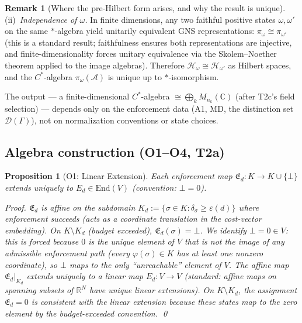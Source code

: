 \documentclass[11pt,a4paper]{article}
\newtheorem{proposition}[theorem]{Proposition}
\theoremstyle{definition}
\newtheorem{remark}[theorem]{Remark}
\newcommand{\eps}{\varepsilon}
\newcommand{\End}{\mathrm{End}}
\begin{document}
\begin{remark}[Where the pre-Hilbert form arises, and why the result is unique]
\noindent(ii)~\textit{Independence of $\omega$.}  In finite dimensions, any two faithful positive states $\omega, \omega'$ on the same $*$-algebra yield unitarily equivalent GNS representations: $\pi_\omega \cong \pi_{\omega'}$ (this is a standard result; faithfulness ensures both representations are injective, and finite-dimensionality forces unitary equivalence via the Skolem--Noether theorem applied to the image algebras).  Therefore $\mathcal{H}_\omega \cong \mathcal{H}_{\omega'}$ as Hilbert spaces, and the $C^*$-algebra $\pi_\omega(\mathcal{A})$ is unique up to $*$-isomorphism.

\noindent The output --- a finite-dimensional $C^*$-algebra $\cong \bigoplus_k M_{n_k}(\mathbb{C})$ (after T2c's field selection) --- depends only on the enforcement data (A1, MD, the distinction set $\mathcal{D}(\Gamma)$), not on normalization conventions or state choices.
\end{remark}

\subsection{Algebra construction (O1--O4, T2a)}

\begin{proposition}[O1: Linear Extension]\label{prop:O1}
Each enforcement map $\mathfrak{E}_d: K \to K \cup \{\bot\}$ extends uniquely to $E_d \in \End(V)$ (convention: $\bot = 0$).

\noindent\textit{Proof.}  $\mathfrak{E}_d$ is affine on the subdomain $K_d := \{\sigma \in K : \delta_\sigma \ge \eps(d)\}$ where enforcement succeeds (acts as a coordinate translation in the cost-vector embedding).  On $K \setminus K_d$ (budget exceeded), $\mathfrak{E}_d(\sigma) = \bot$.  We identify $\bot = 0 \in V$: this is forced because $0$ is the unique element of $V$ that is not the image of any admissible enforcement path (every $\varphi(\sigma) \in K$ has at least one nonzero coordinate), so $\bot$ maps to the only ``unreachable'' element of $V$.  The affine map $\mathfrak{E}_d|_{K_d}$ extends uniquely to a linear map $E_d: V \to V$ (standard: affine maps on spanning subsets of $\mathbb{R}^N$ have unique linear extensions).  On $K \setminus K_d$, the assignment $\mathfrak{E}_d = 0$ is consistent with the linear extension because these states map to the zero element by the budget-exceeded convention.  \qed
\end{proposition}
\end{document}
